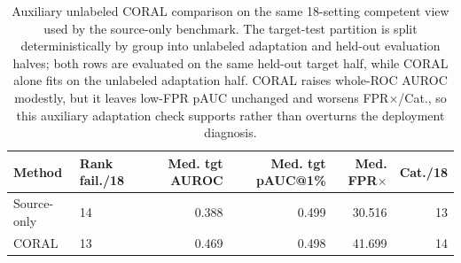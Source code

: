 \begin{table}[htbp]
\centering
\scriptsize
\setlength{\tabcolsep}{2pt}
\caption{Auxiliary unlabeled CORAL comparison on the same 18-setting competent view used by the source-only benchmark. The target-test partition is split deterministically by group into unlabeled adaptation and held-out evaluation halves; both rows are evaluated on the same held-out target half, while CORAL alone fits on the unlabeled adaptation half. CORAL raises whole-ROC AUROC modestly, but it leaves low-FPR pAUC unchanged and worsens FPR$\times$/Cat., so this auxiliary adaptation check supports rather than overturns the deployment diagnosis.}
\label{tab:coral-auxiliary}
\begin{tabular}{llrrrr}
\toprule
Method & Rank fail./18 & Med. tgt AUROC & Med. tgt pAUC@1\% & Med. FPR$\times$ & Cat./18 \\
\midrule
Source-only & 14 & 0.388 & 0.499 & 30.516 & 13 \\
CORAL & 13 & 0.469 & 0.498 & 41.699 & 14 \\
\bottomrule
\end{tabular}
\end{table}
